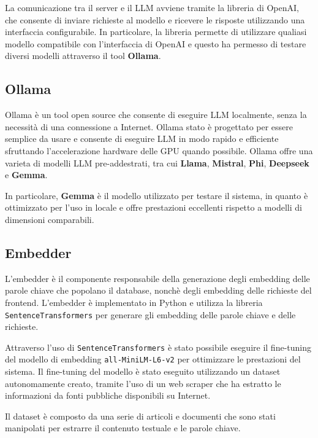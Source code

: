 La comunicazione tra il server e il LLM avviene tramite la
libreria di OpenAI, che consente di inviare richieste al
modello e ricevere le risposte utilizzando una interfaccia
configurabile.
In particolare, la libreria permette di utilizzare qualiasi
modello compatibile con l'interfaccia di OpenAI e questo ha
permesso di testare diversi modelli attraverso il tool
\textbf{Ollama}.

\subsection{Ollama}
\label{sec:ollama}
Ollama è un tool open source che consente di eseguire LLM
localmente, senza la necessità di una connessione a
Internet.
Ollama stato è progettato per essere semplice da usare e
consente di eseguire LLM in modo rapido e efficiente
sfruttando l'accelerazione hardware delle GPU quando
possibile.
Ollama offre una varieta di modelli LLM pre-addestrati, tra
cui \textbf{Llama}\cite{touvron2023llama},
\textbf{Mistral}\cite{jiang2023mistral},
\textbf{Phi}\cite{phi-4},
\textbf{Deepseek}\cite{deepseek-ai2025deepseekr1} e
\textbf{Gemma}\cite{gemma_2025}.

In particolare, \textbf{Gemma} è il modello utilizzato per
testare il sistema, in quanto è ottimizzato per l'uso in
locale e offre prestazioni eccellenti rispetto a modelli di
dimensioni comparabili\cite{gemma_2025}.

\subsection{Embedder}
\label{sec:embedder}
L'embedder è il componente responsabile della generazione
degli embedding delle parole chiave che popolano il
database, nonchè degli embedding delle richieste del
frontend.
L'embedder è implementato in Python e utilizza la libreria
\texttt{SentenceTransformers}\cite{reimers-2019-sentence-bert}
per generare gli embedding delle parole chiave e delle
richieste.

Attraverso l'uso di \texttt{SentenceTransformers} è stato
possibile eseguire il fine-tuning del modello di embedding
\texttt{all-MiniLM-L6-v2} per ottimizzare le prestazioni
del sistema.
Il fine-tuning del modello è stato eseguito utilizzando un
dataset autonomamente creato, tramite l'uso di un web
scraper che ha estratto le informazioni da fonti pubbliche
disponibili su Internet.

Il dataset è composto da una serie di articoli e documenti
che sono stati manipolati per estrarre il contenuto
testuale e le parole chiave.

